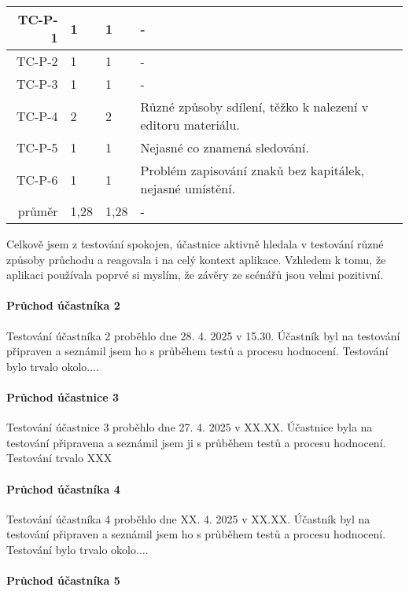 \begin{longtable}{r|p{2cm}|p{2cm}|p{6cm}}
TC-P-1   & 1 & 1 & - \\\hline
TC-P-2   & 1 & 1 & - \\\hline
TC-P-3   & 1 & 1 & - \\\hline
TC-P-4   & 2 & 2 & Různé způsoby sdílení, těžko k nalezení v editoru materiálu. \\\hline
TC-P-5   & 1 & 1 & Nejasné co znamená sledování. \\\hline
TC-P-6   & 1 & 1 & Problém zapisování znaků bez kapitálek, nejasné umístění. \\\hline\hline
průměr   & 1,28 & 1,28 & - \\
\end{longtable}

Celkově jsem z testování spokojen, účastnice aktivně hledala v testování různé způsoby průchodu a reagovala i na celý kontext aplikace.
Vzhledem k tomu, že aplikaci používala poprvé si myslím, že závěry ze scénářů jsou velmi pozitivní.

\paragraph{Průchod účastníka 2}

Testování účastníka 2 proběhlo dne 28. 4. 2025 v 15.30. 
Účastník byl na testování připraven a seznámil jsem ho s průběhem testů a procesu hodnocení. 
Testování bylo trvalo okolo....

\paragraph{Průchod účastnice 3}

Testování účastnice 3 proběhlo dne 27. 4. 2025 v XX.XX. 
Účastnice byla na testování připravena a seznámil jsem ji s průběhem testů a procesu hodnocení. 
Testování trvalo XXX

\paragraph{Průchod účastníka 4}

Testování účastníka 4 proběhlo dne XX. 4. 2025 v XX.XX. 
Účastník byl na testování připraven a seznámil jsem ho s průběhem testů a procesu hodnocení. 
Testování bylo trvalo okolo....

\paragraph{Průchod účastníka 5}

